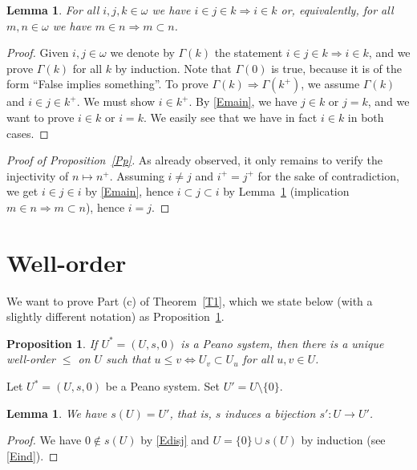 \documentclass[12pt,letterpaper]{article}
\newtheorem{lem}[thm]{Lemma} %
\newtheorem{prop}[thm]{Proposition}
\begin{document}
\begin{lem}\label{Lmain} 
For all \(i,j,k\in\omega\) we have \(i\in j\in k\Rightarrow i\in k\) or, equivalently, for all \(m,n\in\omega\) we have \(m\in n\Rightarrow m\subset n\). 
\end{lem} 
\begin{proof} 
Given \(i,j\in\omega\) we denote by \(\Gamma(k)\) the statement \(i\in j\in k\Rightarrow i\in k\), and we prove \(\Gamma(k)\) for all \(k\) by induction. Note that \(\Gamma(0)\) is true, because it is of the form ``False implies something''. To prove \(\Gamma(k)\Rightarrow \Gamma(k^+)\), we assume \(\Gamma(k)\) and \(i\in j\in k^+\). We must show \(i\in k^+\). By \eqref{Emain}, we have \(j\in k\) or \(j=k\), and we want to prove \(i\in k\) or \(i=k\). We easily see that we have in fact \(i\in k\) in both cases. 
\end{proof} 

\begin{proof}[Proof of Proposition~\ref{Pp}] 
As already observed, it only remains to verify the injectivity of \(n\mapsto n^+\). Assuming \(i\ne j\) and \(i^+=j^+\) for the sake of contradiction, we get \(i\in j\in i\) by \eqref{Emain}, hence \(i\subset j\subset i\) by Lemma~\ref{Lmain} (implication \(m\in n\Rightarrow m\subset n\)), hence \(i=j\). 
\end{proof} 

\section{Well-order} %

We want to prove Part (c) of Theorem~\ref{T1}, which we state below (with a slightly different notation) as Proposition~\ref{Pc}. 

\begin{prop}\label{Pc} 
If \(U^*=(U,s,0)\) is a Peano system, then there is a unique well-order \(\le\) on \(U\) such that \(u\le v\Leftrightarrow U_v\subset U_u\) for all \(u,v\in U\). 
\end{prop} 

Let \(U^*=(U,s,0)\) be a Peano system. Set \(U'=U\setminus\{0\}\). 

\begin{lem}\label{Lbij} 
We have \(s(U)=U'\), that is, \(s\) induces a bijection \(s':U\to U'\). 
\end{lem} 
\begin{proof} 
We have \(0\notin s(U)\) by \eqref{Edisj} and \(U=\{0\}\cup s(U)\) by induction (see \eqref{Eind}). 
\end{proof} 
\end{document}
